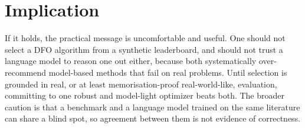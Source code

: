 \documentclass[11pt]{article}
\begin{document}
\section{Implication}

If it holds, the practical message is uncomfortable and useful. One should not select a
DFO algorithm from a synthetic leaderboard, and should not trust a language model to
reason one out either, because both systematically over-recommend model-based methods
that fail on real problems. Until selection is grounded in real, or at least
memorisation-proof real-world-like, evaluation, committing to one robust and model-light
optimizer beats both. The broader caution is that a benchmark and a language model
trained on the same literature can share a blind spot, so agreement between them is not
evidence of correctness.
\end{document}
